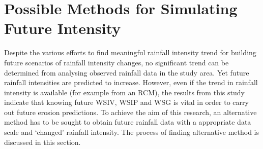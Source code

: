 

\section{Possible Methods for Simulating Future Intensity}
\label{sec:ProposedSimulationMethods}

Despite the various efforts to find meaningful rainfall intensity trend for
building future scenarios of rainfall intensity changes, no significant trend
can be determined from analysing observed rainfall data in the study area.
Yet future rainfall intensities are predicted to increase.
However, even if the trend in rainfall intensity is available (for
example from an RCM), the results from this study indicate that knowing future
WSIV, WSIP and WSG is vital in order to carry out future erosion predictions. To
achieve the aim of this research, an alternative method has to be sought to
obtain future rainfall data with a appropriate data scale and `changed' rainfall
intensity. The process of finding alternative method is discussed in this
section.




